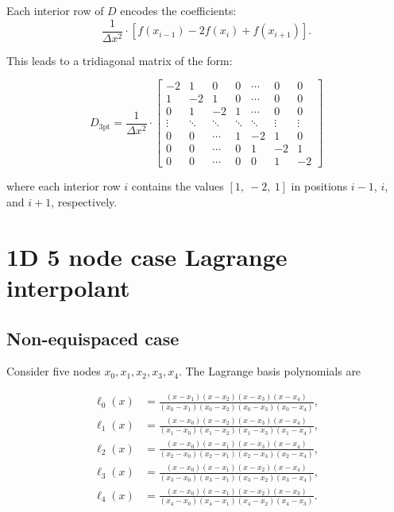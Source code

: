 Each interior row of \(D\) encodes the coefficients:
\[
\frac{1}{\Delta x^2} \cdot \left[ f(x_{i-1}) - 2f(x_i) + f(x_{i+1}) \right].
\]

This leads to a tridiagonal matrix of the form:

\[
D_{3\text{pt}} = \frac{1}{\Delta x^2} \cdot
\begin{bmatrix}
-2 & 1 & 0 & 0 & \cdots & 0 & 0 \\
1 & -2 & 1 & 0 & \cdots & 0 & 0 \\
0 & 1 & -2 & 1 & \cdots & 0 & 0 \\
\vdots & \ddots & \ddots & \ddots & \ddots & \vdots & \vdots \\
0 & 0 & \cdots & 1 & -2 & 1 & 0 \\
0 & 0 & \cdots & 0 & 1 & -2 & 1 \\
0 & 0 & \cdots & 0 & 0 & 1 & -2
\end{bmatrix}
\]

where each interior row \(i\) contains the values \(\left[1,\ -2,\ 1\right]\) in positions \(i-1\), \(i\), and \(i+1\),
respectively.

\newpage


\section{1D 5 node case Lagrange interpolant}
\label{sec::5_nodeLagrange}

\subsection{Non-equispaced case}

Consider five nodes \(x_0, x_1, x_2, x_3, x_4\). The Lagrange basis polynomials are

\[
\begin{aligned}
\ell_0(x)&=\frac{(x-x_1)(x-x_2)(x-x_3)(x-x_4)}
               {(x_0-x_1)(x_0-x_2)(x_0-x_3)(x_0-x_4)},\\[1ex]
\ell_1(x)&=\frac{(x-x_0)(x-x_2)(x-x_3)(x-x_4)}
               {(x_1-x_0)(x_1-x_2)(x_1-x_3)(x_1-x_4)},\\[1ex]
\ell_2(x)&=\frac{(x-x_0)(x-x_1)(x-x_3)(x-x_4)}
               {(x_2-x_0)(x_2-x_1)(x_2-x_3)(x_2-x_4)},\\[1ex]
\ell_3(x)&=\frac{(x-x_0)(x-x_1)(x-x_2)(x-x_4)}
               {(x_3-x_0)(x_3-x_1)(x_3-x_2)(x_3-x_4)},\\[1ex]
\ell_4(x)&=\frac{(x-x_0)(x-x_1)(x-x_2)(x-x_3)}
               {(x_4-x_0)(x_4-x_1)(x_4-x_2)(x_4-x_3)}.
\end{aligned}
\]

